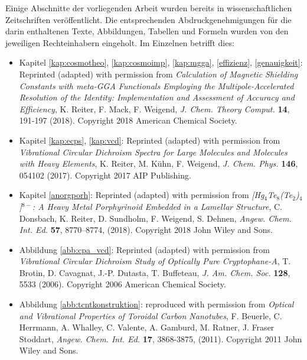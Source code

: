 Einige Abschnitte der vorliegenden Arbeit wurden bereits in wissenschaftlichen Zeitschriften veröffentlicht. Die entsprechenden Abdruckgenehmigungen für die darin enthaltenen Texte, Abbildungen, Tabellen und Formeln wurden von den jeweiligen Rechteinhabern eingeholt. Im Einzelnen betrifft dies:

\begin{itemize}
\item{Kapitel \ref{kap:cosmotheo}, \ref{kap:cosmoimp}, \ref{kap:mgga}, \ref{effizienz}, \ref{genauigkeit}: Reprinted (adapted) with permission from \textit{Calculation of Magnetic Shielding Constants with meta-GGA Functionals Employing the Multipole-Accelerated Resolution of the Identity: Implementation and Assessment of Accuracy and Efficiency}, K. Reiter, F. Mack, F. Weigend, \textit{J. Chem. Theory Comput.} \textbf{14}, 191-197 (2018). Copyright 2018 American Chemical Society.}
\item{Kapitel \ref{kap:ecps}, \ref{kap:vcd}: Reprinted (adapted) with permission from \textit{Vibrational Circular Dichroism Spectra for Large Molecules and Molecules with Heavy Elements}, K. Reiter, M. Kühn, F. Weigend, \textit{J. Chem. Phys.} \textbf{146}, 054102 (2017). Copyright 2017 AIP Publishing.}
\item{Kapitel \ref{anorgporh}: Reprinted (adapted) with permission from \textit{[Hg$_4$Te$_8$(Te$_2$)$_4$]$^{8-}$: A Heavy Metal Porphyrinoid Embedded in a Lamellar Structure}, C. Donsbach, K. Reiter, D. Sundholm, F. Weigend, S. Dehnen, \textit{Angew. Chem. Int. Ed.} \textbf{57}, 8770–8774, (2018). Copyright 2018 John Wiley and Sons.}
\item{Abbildung \ref{abb:cpa_vcd}: Reprinted (adapted) with permission from \textit{Vibrational Circular Dichroism Study of Optically Pure Cryptophane-A}, T. Brotin, D. Cavagnat, J.-P. Dutasta, T. Buffeteau, \textit{J. Am. Chem. Soc.} \textbf{128}, 5533 (2006). Copyright 2006 American Chemical Society.}
\item{Abbildung \ref{abb:tcntkonstruktion}: reproduced with permission from \textit{Optical and Vibrational Properties of Toroidal Carbon Nanotubes}, F. Beuerle, C. Herrmann, A. Whalley, C. Valente, A. Gamburd, M. Ratner, J. Fraser Stoddart, \textit{Angew. Chem. Int. Ed.} \textbf{17}, 3868-3875, (2011). Copyright 2011 John Wiley and Sons.}
\end{itemize}